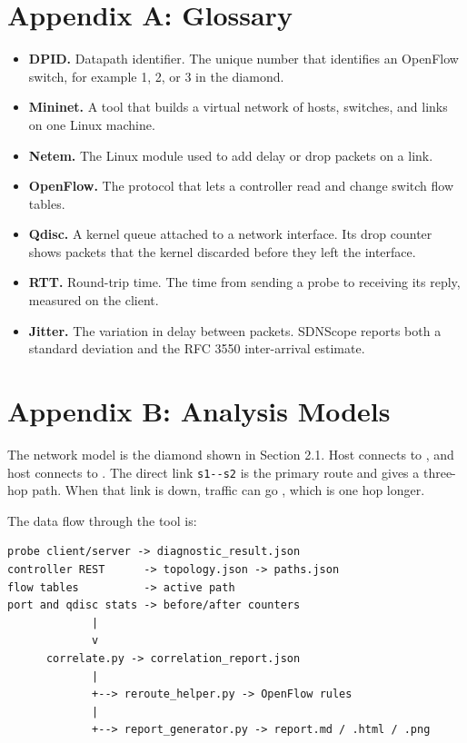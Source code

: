 \documentclass[11pt,a4paper]{article}
\newcommand{\code}[1]{\texttt{\detokenize{#1}}}
\begin{document}
\section*{Appendix A: Glossary}
\begin{itemize}
  \item \textbf{DPID.} Datapath identifier. The unique number that identifies an OpenFlow switch, for example 1, 2, or 3 in the diamond.
  \item \textbf{Mininet.} A tool that builds a virtual network of hosts, switches, and links on one Linux machine.
  \item \textbf{Netem.} The Linux \code{tc qdisc} module used to add delay or drop packets on a link.
  \item \textbf{OpenFlow.} The protocol that lets a controller read and change switch flow tables.
  \item \textbf{Qdisc.} A kernel queue attached to a network interface. Its drop counter shows packets that the kernel discarded before they left the interface.
  \item \textbf{RTT.} Round-trip time. The time from sending a probe to receiving its reply, measured on the client.
  \item \textbf{Jitter.} The variation in delay between packets. SDNScope reports both a standard deviation and the RFC 3550 inter-arrival estimate.
\end{itemize}

{}
\section*{Appendix B: Analysis Models}
The network model is the diamond shown in Section 2.1. Host \code{h1} connects to \code{s1}, and host \code{h2} connects to \code{s2}. The direct link \verb|s1--s2| is the primary route and gives a three-hop path. When that link is down, traffic can go \code{h1 -> s1 -> s3 -> s2 -> h2}, which is one hop longer.

The data flow through the tool is:

\begin{verbatim}
probe client/server -> diagnostic_result.json
controller REST      -> topology.json -> paths.json
flow tables          -> active path
port and qdisc stats -> before/after counters
             |
             v
      correlate.py -> correlation_report.json
             |
             +--> reroute_helper.py -> OpenFlow rules
             |
             +--> report_generator.py -> report.md / .html / .png
\end{verbatim}
\end{document}
